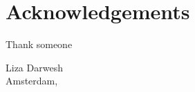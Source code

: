 \chapter{Acknowledgements}

Thank someone 


\vspace*{\fill}
\begin {flushright}
Liza Darwesh\\
Amsterdam, \date{\today}
\end{flushright}
\clearpage

